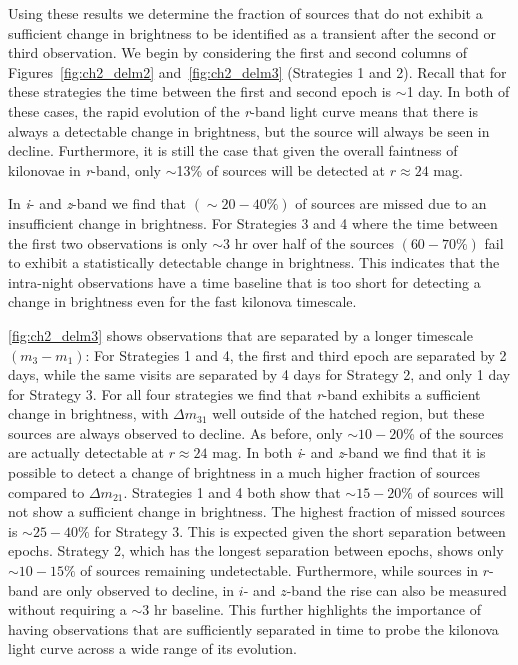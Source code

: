 Using these results we determine the fraction of sources that do not exhibit a sufficient change in brightness to be identified as a transient after the second or third observation. We begin by considering the first and second columns of Figures~\ref{fig:ch2_delm2} and~\ref{fig:ch2_delm3} (Strategies 1 and 2). Recall that for these strategies the time between the first and second epoch is $\sim$1 day. In both of these cases, the rapid evolution of the {\em r}-band light curve means that there is always a detectable change in brightness, but the source will always be seen in decline. Furthermore, it is still the case that given the overall faintness of kilonovae in {\em r}-band, only $\sim$13\% of sources will be detected at $r\approx24$ mag.

In {\em i}- and {\em z}-band we find that $(\sim 20-40\%)$ of sources are missed due to an insufficient change in brightness. For Strategies 3 and 4 where the time between the first two observations is only $\sim$3 hr over half of the sources $(60-70\%)$ fail to exhibit a statistically detectable change in brightness. This indicates that the intra-night observations have a time baseline that is too short for detecting a change in brightness even for the fast kilonova timescale.

\autoref{fig:ch2_delm3} shows observations that are separated by a longer timescale $(m_3 - m_1)$: For Strategies 1 and 4, the first and third epoch are separated by 2 days, while the same visits are separated by 4 days for Strategy 2, and only 1 day for Strategy 3. For all four strategies we find that {\em r}-band exhibits a sufficient change in brightness, with $\Delta m_{31}$ well outside of the hatched region, but these sources are always observed to decline. As before, only $\sim10-20$\% of the sources are actually detectable at $r\approx24$ mag. In both {\em i}- and {\em z}-band we find that it is possible to detect a change of brightness in a much higher fraction of sources compared to $\Delta m_{21}$. Strategies 1 and 4 both show that $\sim 15-20\%$ of sources will not show a sufficient change in brightness. The highest fraction of missed sources is $\sim 25-40\%$ for Strategy 3. This is expected given the short separation between epochs. Strategy 2, which has the longest separation between epochs, shows only $\sim 10-15 \%$ of sources remaining undetectable. Furthermore, while sources in $r$-band are only observed to decline, in $i$- and $z$-band the rise can also be measured without requiring a $\sim$3 hr baseline. This further highlights the importance of having observations that are sufficiently separated in time to probe the kilonova light curve across a wide range of its evolution.

